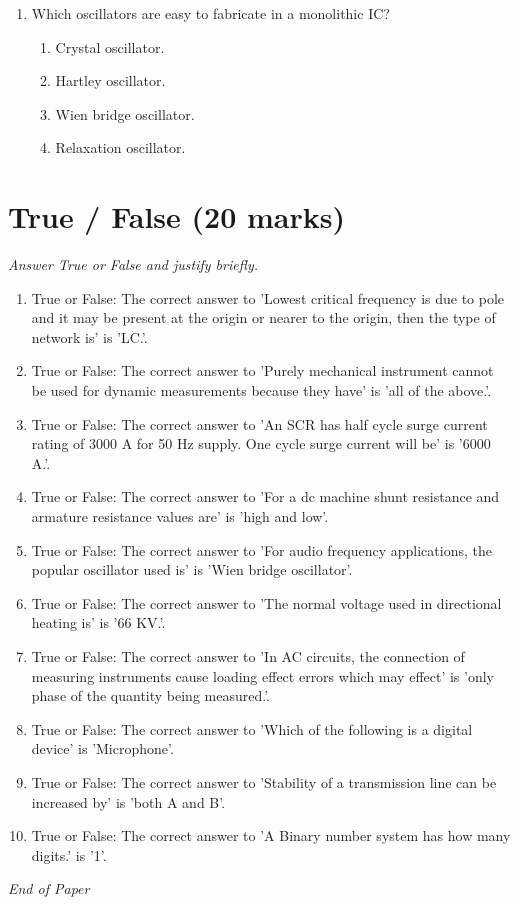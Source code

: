 \documentclass[12pt]{article}
\begin{document}
\begin{enumerate}[label=\arabic*.]
\begin{enumerate}[label=(\alph*)]
    \item valance carriers
\end{enumerate}
\item Which oscillators are easy to fabricate in a monolithic IC?
\begin{enumerate}[label=(\alph*)]
    \item Crystal oscillator.
    \item Hartley oscillator.
    \item Wien bridge oscillator.
    \item Relaxation oscillator.
\end{enumerate}
\end{enumerate}

\section*{True / False (20 marks)}
\textit{Answer True or False and justify briefly.}
\begin{enumerate}[label=\arabic*.]
\item True or False: The correct answer to 'Lowest critical frequency is due to pole and it may be present at the origin or nearer to the origin, then the type of network is' is 'LC.'.
\item True or False: The correct answer to 'Purely mechanical instrument cannot be used for dynamic measurements because they have' is 'all of the above.'.
\item True or False: The correct answer to 'An SCR has half cycle surge current rating of 3000 A for 50 Hz supply. One cycle surge current will be' is '6000 A.'.
\item True or False: The correct answer to 'For a dc machine shunt resistance and armature resistance values are' is 'high and low'.
\item True or False: The correct answer to 'For audio frequency applications, the popular oscillator used is' is 'Wien bridge oscillator'.
\item True or False: The correct answer to 'The normal voltage used in directional heating is' is '66 KV.'.
\item True or False: The correct answer to 'In AC circuits, the connection of measuring instruments cause loading effect errors which may effect' is 'only phase of the quantity being measured.'.
\item True or False: The correct answer to 'Which of the following is a digital device' is 'Microphone'.
\item True or False: The correct answer to 'Stability of a transmission line can be increased by' is 'both A and B'.
\item True or False: The correct answer to 'A Binary number system has how many digits.' is '1'.
\end{enumerate}

\vfill
\noindent\textit{End of Paper}
\end{document}
